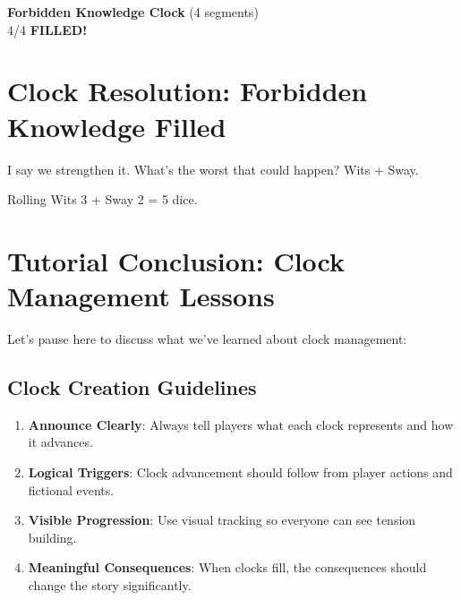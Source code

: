 
\begin{center}
\textbf{Forbidden Knowledge Clock} (4 segments)\\
\fbox{\textcolor{clockcolor}{\clocksegment\clocksegment\clocksegment\clocksegment}} 4/4 \textbf{FILLED!}
\end{center}

\section*{Clock Resolution: Forbidden Knowledge Filled}


 I say we strengthen it. What's the worst that could happen? Wits + Sway.


 Rolling Wits 3 + Sway 2 = 5 dice.   



\section*{Tutorial Conclusion: Clock Management Lessons}

 Let's pause here to discuss what we've learned about clock management:

\subsection*{Clock Creation Guidelines}

\begin{enumerate}[leftmargin=*]
\item \textbf{Announce Clearly}: Always tell players what each clock represents and how it advances.
\item \textbf{Logical Triggers}: Clock advancement should follow from player actions and fictional events.
\item \textbf{Visible Progression}: Use visual tracking so everyone can see tension building.
\item \textbf{Meaningful Consequences}: When clocks fill, the consequences should change the story significantly.
\end{enumerate}

